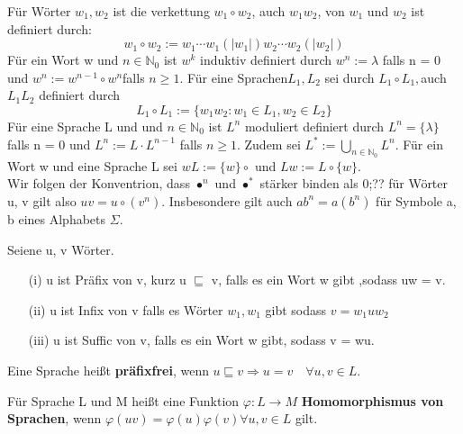     Für Wörter \(w_{1}, w_{2}\) ist die verkettung  \(w_{1} \circ w_{2}\), auch \(w_{1}w_{2}\), von \(w_{1}\) und \(w_{2}\) ist definiert durch:
    \[
        w_{1} \circ w_{2} := w_{1} \cdots w_{1} (\lvert w_{1} \rvert)w_{2} \cdots w_{2} (\lvert w_{2} \rvert)
    \]
    Für ein Wort w und \(n \in \mathbb{N}_{0}\) ist \(w^{k}\) induktiv definiert durch \(w^{n} := \lambda \) falls n = 0 und \(w^{n} := w^{n-1} \circ w^{n} \)falls \(n \geq  1\). Für eine Sprachen\( L_{1}, L_{2}\) sei durch \(L_{1} \circ L_{1}, \)auch \(L_{1}L_{2}\) definiert durch
    \[
        L_{1} \circ L_{1} := \{w_{1}w_{2} : w_{1} \in L_{1}, w_{2} \in L_{2}\}
    \]
    Für eine Sprache L und und \(n \in\mathbb{N}_{0}\) ist \(L^{n}\) moduliert definiert durch \(L^{n} = \{\lambda\} \)falls n = 0 und \(L^{n} := L \cdot L^{n - 1}\) falls \(n \geq 1\). Zudem sei \(L^{*} := \bigcup \limits_{n \in \mathbb{N}_{0}}L^{n}\). Für ein Wort w und eine Sprache L sei \(wL :=\{w\}\circ\) und \(Lw := L\circ \{w\}\).\\Wir folgen der Konventrion, dass \(\bullet^{n}\) und \(\bullet^{*}\) stärker binden als 0;?? für Wörter u, v gilt also \(uv = u \circ (v^{n})\). Insbesondere gilt auch \(ab^{n} = a(b^{n})\) für Symbole a, b eines Alphabets \(\Sigma\).

    Seiene u, v Wörter.
    \begin{itemize}
        \item [(i)] u ist Präfix von v, kurz u \(\sqsubseteq\) v, falls es ein Wort w gibt ,sodass uw = v.
        \item [(ii)] u ist Infix von v falls es Wörter \(w_{1}, w_{1}\) gibt sodass \(v = w_{1} u w_{2}\)
        \item [(iii)] u ist Suffic von v, falls es ein Wort w gibt, sodass v = wu.
    \end{itemize}

    Eine Sprache heißt \textbf{präfixfrei}, wenn \(u\sqsubseteq v \Rightarrow u = v \quad \forall u,v \in L\).

    Für Sprache L und M heißt eine Funktion \(\varphi : L \rightarrow M\) \textbf{Homomorphismus von Sprachen}, wenn \(\varphi(uv) = \varphi (u) \varphi (v) \forall u, v \in L\) gilt.

